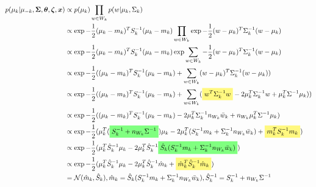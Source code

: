 \documentclass[12pt]{article}
\newcommand{\ghighlight}[1]{%
  \colorbox{green!50}{$\displaystyle#1$}}
\newcommand{\yhighlight}[1]{%
  \colorbox{yellow!50}{$\displaystyle#1$}}
\begin{document}
\begin{equation*}
\begin{split}
p(\mu_k | \mu_{-k}, \bm{\Sigma}, \bm{\theta}, \bm{\zeta}, \bm{x}) & \propto p(\mu_k) \prod_{w \in W_k} p(w | \mu_k, \Sigma_k) \\
& \propto \exp{-\frac{1}{2}(\mu_k - m_k)^T S_k^{-1} (\mu_k - m_k)} \prod_{w \in W_k} \exp{-\frac{1}{2}(w - \mu_k)^T \Sigma_k^{-1} (w - \mu_k)} \\
& \propto \exp{-\frac{1}{2}(\mu_k - m_k)^T S_k^{-1} (\mu_k - m_k)} \exp{\sum_{w \in W_k} -\frac{1}{2}(w - \mu_k)^T \Sigma_k^{-1} (w - \mu_k)} \\
& \propto \exp{-\frac{1}{2}((\mu_k - m_k)^T S_k^{-1} (\mu_k - m_k) + \sum_{w \in W_k} (w - \mu_k)^T \Sigma_k^{-1} (w - \mu_k))} \\
& \propto \exp{-\frac{1}{2}((\mu_k - m_k)^T S_k^{-1} (\mu_k - m_k) + \sum_{w \in W_k}(\yhighlight{w^T\Sigma_k^{-1}w} - 2 \mu_k^T\Sigma_k^{-1}w + \mu_k^T\Sigma^{-1}\mu_k))} \\
& \propto \exp{-\frac{1}{2}((\mu_k - m_k)^T S_k^{-1} (\mu_k - m_k) - 2 \mu_k^T\Sigma_k^{-1}n_{W_k}\bar{w}_k + n_{W_k}\mu_k^T\Sigma^{-1}\mu_k)} \\
& \propto \exp{-\frac{1}{2}(\mu_k^T(\ghighlight{S_k^{-1} + n_{W_k}\Sigma^{-1}})\mu_k - 2\mu_k^T(S_k^{-1}m_k + \Sigma_k^{-1}n_{W_k}\bar{w}_k) + \yhighlight{m_k^TS_k^{-1}m_k})} \\
& \propto \exp{-\frac{1}{2}(\mu_k^T\hat{S}_k^{-1}\mu_k - 2\mu_k^T\hat{S}_k^{-1}\ghighlight{\hat{S}_k(S_k^{-1}m_k + \Sigma_k^{-1}n_{W_k}\bar{w}_k)})} \\
& \propto \exp{-\frac{1}{2}(\mu_k^T\hat{S}_k^{-1}\mu_k - 2\mu_k^T\hat{S}_k^{-1}\hat{m}_k + \yhighlight{\hat{m}_k^T\hat{S}_k^{-1}\hat{m}_k})} \\
& = \mathcal{N}(\hat{m}_k, \hat{S}_k), \hat{m}_k = \hat{S}_k(S_k^{-1}m_k + \Sigma_k^{-1}n_{W_k}\bar{w}_k), \hat{S}_k^{-1} = S_k^{-1} + n_{W_k}\Sigma^{-1}
\end{split}
\end{equation*}
\end{document}
